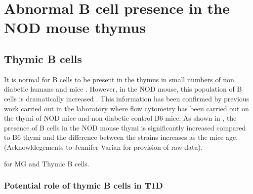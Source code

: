 \section{Abnormal B cell presence in the NOD mouse thymus}
\subsection{Thymic B cells}



It is normal for B cells to be present in the thymus in small numbers \citep{Isaacson1987, Akashi2000} of non diabetic humans \citep{Isaacson1987} and mice \citep{Akashi2000}. 
However, in the NOD mouse, this population of B cells is dramatically increased \citep{OReilly1994}.
This information has been confirmed by previous work carried out in the laboratory where flow cytometry has been carried out on the thymi of NOD mice and non diabetic control B6 mice.
As shown in , the presence of B cells in the NOD mouse thymi is significantly increased compared to B6 thymi and the difference between the strains increases as the mice age. (Acknowldegements to Jennifer Varian for provision of raw data). 

  \citep{Christensson1998} for MG and Thymic B cells.

\subsubsection{Potential role of thymic B cells in T1D}



































